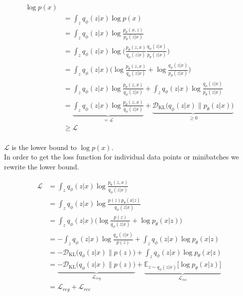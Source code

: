 \begin{align*}
  \log p(x)\\
  &= \int_z q_\phi(z|x) \log p(x)\\
  &= \int_z q_\phi(z|x) \log \frac{p_\theta(x,z)}{p_\theta(z|x)} \tag{Bayes' rule}\\
  &= \int_z q_\phi(z|x) \log\bigg(\frac{p_\theta(z,x)}{q_\phi(z|x)} \frac{q_\phi(z|x)}{p_\theta(z|x)}\bigg) \tag{Chain rule}\\
  &= \int_z q_\phi(z|x) \bigg(\log\frac{p_\theta(z,x)}{q_\phi(z|x)} + \log\frac{q_\phi(z|x)}{p_\theta(z|x)}\bigg)\\
  &= \int_z q_\phi(z|x) \log \frac{p_\theta(z,x)}{q_\phi(z|x)} + \int_z q_\phi(z|x) \log\frac{q_\phi(z|x)}{p_\theta(z|x)}\\
  &= \underbrace{\int_z q_\phi(z|x) \log \frac{p_\theta(z,x)}{q_\phi(z|x)}}_{= \mathcal{L}}+ \underbrace{\mathcal{D}_{\mathrm{KL}}\big(q_\phi(z|x) \| p_\theta(z|x)\big)}_{\geq 0}\\
  &\geq \mathcal{L}\\
\end{align*}

$\mathcal{L}$ is the lower bound to $\log p(x)$.\\
In order to get the loss function for individual data points or minibatches we rewrite the lower bound.

\begin{align*}
  \mathcal{L}
  &= \int_z q_\phi(z|x) \log\frac{p_\theta(z,x)}{q_\phi(z|x)}\\
  &= \int_z q_\phi(z|x) \log\frac{p(z) p_\theta(x|z)}{q_\phi(z|x)} \tag{we assume that x is conditionally dependent on z}\\
  &= \int_z q_\phi(z|x) \bigg(\log\frac{p(z)}{q_\phi(z|x)} + \log p_\theta(x|z)\bigg)\\
  &= -\int_z q_\phi(z|x) \log\frac{q_\phi(z|x)}{p(z)} + \int_z q_\phi(z|x) \log p_\theta(x|z)\\
  &= -\mathcal{D}_{\mathrm{KL}}\big(q_\phi(z|x) \| p(z)\big) + \int_z q_\phi(z|x) \log p_\theta(x|z)\\
  &= \underbrace{-\mathcal{D}_{\mathrm{KL}}\big(q_\phi(z|x) \| p(z)\big)}_{\mathcal{L}_{reg}} + \underbrace{\mathbb{E}_{z \sim q_\phi(z|x)}\big[ \log p_\theta(x|z)\big]}_{\mathcal{L}_{rec}}\\
  &= \mathcal{L}_{reg} + \mathcal{L}_{rec}
\end{align*}
